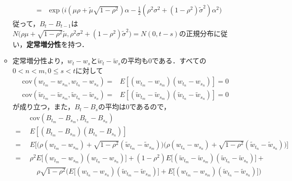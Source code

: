 \documentclass{jsarticle}
\begin{document}
\begin{enumerate}
\begin{itemize}
\[\begin{split}
&=\,\,\, \exp \Bigr(i(\mu\rho + \tilde{\mu}\sqrt{1-\rho^2})\alpha -\frac{1}{2}(\rho^2 \sigma^2 + (1-\rho^2)\tilde{\sigma}^2)\alpha^2 \Bigr)
\end{split}
\]
従って，$B_t-B_{t-1}$は$N\Bigr(\rho \mu + \sqrt{1-\rho^2}\tilde{\mu} ,\rho^2 \sigma^2 + (1-\rho^2)\tilde{\sigma}^2 \Bigr)=N(0, t-s)$の正規分布に従い，{\bf 定常増分性}を持つ．
\item
定常増分性より，$w_t-w_s$と$\tilde{w}_t - \tilde{w}_s$の平均も$0$である．すべての$0<n<m,0 \le s < t$に対して
\[
\begin{split}
\text{cov}(w_{t_m} - w_{s_m }, w_{t_n} - w_{s_n})=&E[(w_{t_m} - w_{s_m })(w_{t_n} - w_{s_n})]=0\\
\text{cov}(\tilde{w}_{t_m} - \tilde{w}_{s_m }, \tilde{w}_{t_n} - \tilde{w}_{s_n})=&E[(\tilde{w}_{t_m} - \tilde{w}_{s_m })(\tilde{w}_{t_n} - \tilde{w}_{s_n})]=0
\end{split}
\]
が成り立つ，また，$B_t-B_s$の平均は$0$であるので，
\[
\begin{split}
&\,\,\,  \text{cov}(B_{t_m} - B_{s_m }, B_{t_n} - B_{s_n})\\
=&\,\,\, E[(B_{t_m} - B_{s_m })(B_{t_n} - B_{s_n})]\\
=&\,\,\, E \Bigr[ \Bigr( \rho (w_{t_m} - w_{s_m}) + \sqrt{1-\rho^2}(\tilde{w}_{t_m} - \tilde{w}_{s_m}) \Bigr)\Bigr( \rho (w_{t_n} - w_{s_n}) + \sqrt{1-\rho^2}(\tilde{w}_{t_n} - \tilde{w}_{s_n}) \Bigr)  \Bigr]\\
=&\,\,\, \rho^2 E \Bigr[   (w_{t_m} - w_{s_m})(w_{t_n} - w_{s_n}) \Bigr] + (1-\rho^2)E \Bigr[ (\tilde{w}_{t_m} - \tilde{w}_{s_m})(\tilde{w}_{t_n} - \tilde{w}_{s_n})\Bigr]  + \\
&\,\,\,\,\,\,\,\,\,\rho\sqrt{1-\rho^2}\Bigr( E \Bigr[(w_{t_n} - w_{s_n})(\tilde{w}_{t_m} - \tilde{w}_{s_m})\Bigr] +  E \Bigr [(w_{t_m} - w_{s_m})(\tilde{w}_{t_n} - \tilde{w}_{s_n}) \Bigr] \Bigr)\\

\end{split}\]
\end{itemize}
\end{enumerate}
\end{document}
